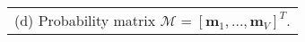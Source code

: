 \scriptsize
\begin{tabular}[t]{l}
	(d) Probability matrix $\mathcal{M} =[\bm{m}_1, \ldots, \bm{m}_V]^T$.
\end{tabular}